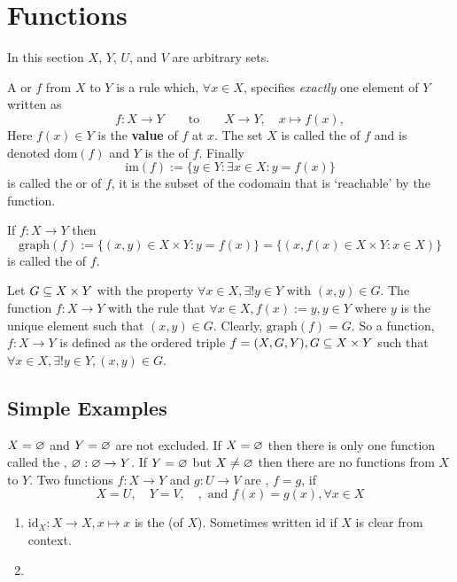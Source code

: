 \section{Functions}

\begin{center}
    In this section $X$, $Y$, $U$, and $V$ are arbitrary sets.
\end{center}

A  or  $f$ from $X$ to $Y$ is a rule which, $\forall x \in X$, specifies \emph{exactly} one element of $Y$ written as 
$$
f : X \to Y \qquad \text{to} \qquad X \to Y, \quad x \mapsto f(x),
$$
Here $f(x) \in Y$ is the \textbf{value} of $f$ at $x$. The set $X$ is called the  of $f$ and is denoted $\text{dom}(f)$ and $Y$ is the  of $f$. Finally 
$$
\text{im}(f) := \{y \in Y: \exists x \in X : y = f(x)\}
$$
is called the  or  of $f$, it is the subset of the codomain that is `reachable' by the function.

If $f : X \to Y$ then 
$$
\text{graph}(f) := \{(x,y) \in X \times Y : y = f(x)\} = \{(x,f(x) \in X \times Y: x \in X)\}
$$
is called the  of $f$.

\begin{remark}
    Let $G \subseteq X \times Y$ with the property $\forall x \in X, \exists! y \in Y$ with $(x,y) \in G$. The function $f : X \to Y$ with the rule that $\forall x \in X, f(x) := y, y \in Y$ where $y$ is the unique element such that $(x,y) \in G$. Clearly, $\text{graph}(f) = G$. So a function, $f:X\to Y$ is defined as the ordered triple $f = (X,G,Y), G \subseteq X \times Y$ such that $\forall x \in X, \exists! y \in Y, (x,y) \in G$.
\end{remark}

\subsection{Simple Examples}

$X = \varnothing$ and $Y = \varnothing$ are not excluded. If $X = \varnothing$ then there is only one function called the , $\varnothing : \varnothing \to Y$. If $Y = \varnothing$ but $X \neq \varnothing$ then there are no functions from $X$ to $Y$. Two functions $f : X \to Y$ and $g : U \to V$ are , $f = g$, if 
$$
X = U, \quad Y = V, \quad, \text{ and } f(x) = g(x), \forall x \in X
$$

\begin{example}
    \begin{enumerate}[label=(\alph*)]
        \item $\text{id}_X: X \to X, x \mapsto x$ is the  (of $X$). Sometimes written $\text{id}$ if $X$ is clear from context.
        \item 
    \end{enumerate}
\end{example}